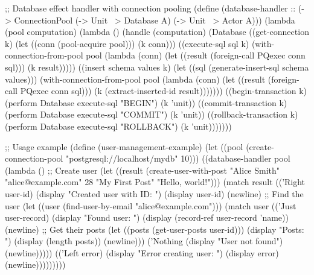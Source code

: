 \begin{example}
\begin{lambdustcode}
;; Database effect handler with connection pooling
(define (database-handler :: (-> ConnectionPool
                                (-> Unit ~> {Database} A)
                                (-> Unit ~> {Actor} A)))
  (lambda (pool computation)
    (lambda ()
      (handle (computation)
        (Database
          ((get-connection k)
           (let ((conn (pool-acquire pool)))
             (k conn)))
          ((execute-sql sql k) 
           (with-connection-from-pool pool
             (lambda (conn)
               (let ((result (foreign-call PQexec conn sql)))
                 (k result)))))
          ((insert schema values k)
           (let ((sql (generate-insert-sql schema values)))
             (with-connection-from-pool pool
               (lambda (conn)
                 (let ((result (foreign-call PQexec conn sql)))
                   (k (extract-inserted-id result)))))))
          ((begin-transaction k)
           (perform Database execute-sql "BEGIN")
           (k 'unit))
          ((commit-transaction k)
           (perform Database execute-sql "COMMIT") 
           (k 'unit))
          ((rollback-transaction k)
           (perform Database execute-sql "ROLLBACK")
           (k 'unit)))))))

;; Usage example
(define (user-management-example)
  (let ((pool (create-connection-pool "postgresql://localhost/mydb" 10)))
    ((database-handler pool
       (lambda ()
         ;; Create user
         (let ((result (create-user-with-post "Alice Smith" 
                                             "alice@example.com" 
                                             28 
                                             "My First Post"
                                             "Hello, world!")))
           (match result
             (('Right user-id)
              (display "Created user with ID: ") (display user-id) (newline)
              ;; Find the user
              (let ((user (find-user-by-email "alice@example.com")))
                (match user
                  (('Just user-record)
                   (display "Found user: ") (display (record-ref user-record 'name)) (newline)
                   ;; Get their posts
                   (let ((posts (get-user-posts user-id)))
                     (display "Posts: ") (display (length posts)) (newline)))
                  ('Nothing
                   (display "User not found") (newline)))))
             (('Left error)
              (display "Error creating user: ") (display error) (newline)))))))))
\end{lambdustcode}
\end{example}

